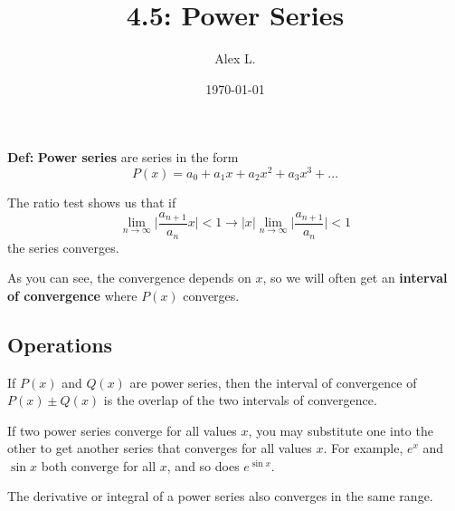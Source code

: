 \documentclass{article}
\title{4.5: Power Series}
\author{Alex L.}
\date{\today}
\begin{document}
\maketitle
\textbf{Def:} \textbf{Power series} are series in the form $$P(x) = a_0 + a_1x + a_2x^2 + a_3 x^3 + ...$$

The ratio test shows us that if $$\lim_{n \to \infty} \vert \frac{a_{n+1}}{a_n}x \vert <1 \rightarrow \vert x\vert \lim_{n \to\infty}\vert \frac{a_{n+1}}{a_n} \vert<1$$the series converges. 

As you can see, the convergence depends on $x$, so we will often get an \textbf{interval of convergence} where $P(x)$ converges.

\subsection{Operations}

If $P(x)$ and $Q(x)$ are power series, then the interval of convergence of $P(x) \pm Q(x)$ is the overlap of the two intervals of convergence.

If two power series converge for all values $x$, you may substitute one into the other to get another series that converges for all values $x$. For example, $e^x$ and $\sin x$ both converge for all $x$, and so does $e^{\sin x}$.

The derivative or integral of a power series also converges in the same range.
\end{document}
